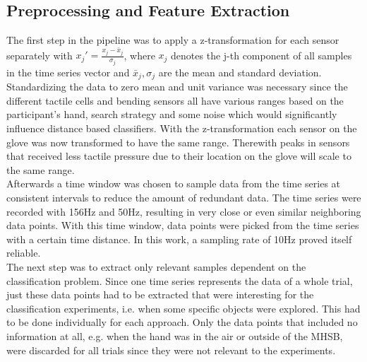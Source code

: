 \subsection{Preprocessing and Feature Extraction}
The first step in the pipeline was to apply a z-transformation for each sensor separately with $ x_{j}' = \frac{x_{j}-\bar{x}_{j}}{\sigma_{j}} $, where $ x_{j} $ denotes the j-th component of all samples in the time series vector and $ \bar{x}_{j},\sigma_{j} $ are the mean and standard deviation. Standardizing the data to zero mean and unit variance was necessary since the different tactile cells and bending sensors all have various ranges based on the participant's hand, search strategy and some noise which would significantly influence distance based classifiers. With the z-transformation each sensor on the glove was now transformed to have the same range. Therewith peaks in sensors that received less tactile pressure due to their location on the glove will scale to the same range. \\
Afterwards a time window was chosen to sample data from the time series at consistent intervals to reduce the amount of redundant data. The time series were recorded with 156Hz and 50Hz, resulting in very close or even similar neighboring data points. With this time window, data points were picked from the time series with a certain time distance. In this work, a sampling rate of 10Hz proved itself reliable.\\
The next step was to extract only relevant samples dependent on the classification problem. Since one time series represents the data of a whole trial, just these data points had to be extracted that were interesting for the classification experiments, i.e. when some specific objects were explored. This had to be done individually for each approach. Only the data points that included no information at all, e.g. when the hand was in the air or outside of the MHSB, were discarded for all trials since they were not relevant to the experiments. \\
